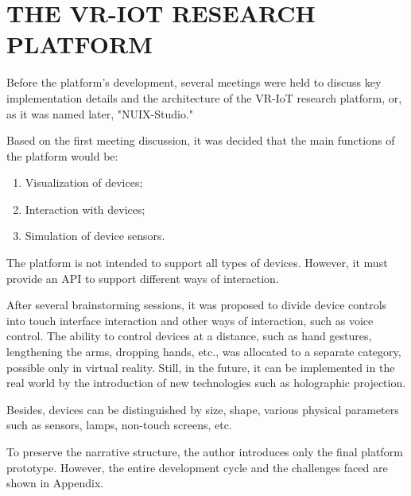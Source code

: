 
\chapter{THE VR-IOT RESEARCH PLATFORM}

Before the platform's development, several meetings were held to discuss key implementation details and the architecture of the VR-IoT research platform, or, as it was named later, "NUIX-Studio."

Based on the first meeting discussion, it was decided that the main functions of the platform would be:
\begin{enumerate}
     \item Visualization of devices;
     \item Interaction with devices;
     \item Simulation of device sensors.
\end{enumerate}

The platform is not intended to support all types of devices. However, it must provide an API to support different ways of interaction.

After several brainstorming sessions, it was proposed to divide device controls into touch interface interaction and other ways of interaction, such as voice control. The ability to control devices at a distance, such as hand gestures, lengthening the arms, dropping hands, etc., was allocated to a separate category, possible only in virtual reality. Still, in the future, it can be implemented in the real world by the introduction of new technologies such as holographic projection.

Besides, devices can be distinguished by size, shape, various physical parameters such as sensors, lamps, non-touch screens, etc.

To preserve the narrative structure, the author introduces only the final platform prototype. However, the entire development cycle and the challenges faced are shown in Appendix.

